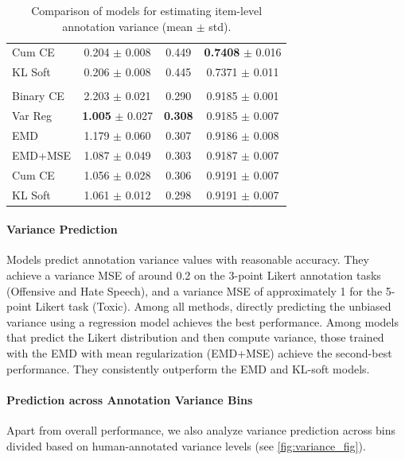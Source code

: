 \documentclass{article} %
\begin{document}
\begin{table}{}
{\begin{tabular}{l c c c}
Cum CE        &  0.204 {\scriptsize$\pm$ 0.008} & 0.449 & \textbf{0.7408} {\scriptsize$\pm$ 0.016} \\
KL Soft       &  0.206 {\scriptsize$\pm$ 0.008} & 0.445 & 0.7371 {\scriptsize$\pm$ 0.011} \\\midrule

\rowcolor{lightblue} \multicolumn{4}{l}{\textbf{Toxic}} \\ \midrule
Binary CE        &  2.203 {\scriptsize$\pm$ 0.021} & 0.290 & 0.9185 {\scriptsize$\pm$ 0.001} \\\hdashline
Var Reg       &  \textbf{1.005} {\scriptsize$\pm$ 0.027} &\textbf{ 0.308} & 0.9185 {\scriptsize$\pm$ 0.007} \\
EMD           &  1.179 {\scriptsize$\pm$ 0.060} & 0.307 & 0.9186 {\scriptsize$\pm$ 0.008} \\
EMD+MSE       &  1.087 {\scriptsize$\pm$ 0.049} & 0.303 & 0.9187 {\scriptsize$\pm$ 0.007} \\
Cum CE        &  1.056 {\scriptsize$\pm$ 0.028} & 0.306 & 0.9191 {\scriptsize$\pm$ 0.007} \\
KL Soft       &  1.061 {\scriptsize$\pm$ 0.012} & 0.298 & 0.9191 {\scriptsize$\pm$ 0.007} \\

\bottomrule
\end{tabular}
}
\caption{Comparison of models for estimating item-level annotation variance (mean $\pm$ std).}\vspace{-14.5pt}
\label{var_pred}
\end{table}


\paragraph{Variance Prediction} 
Models predict annotation variance values with reasonable accuracy. They achieve a variance MSE of around 0.2 on the 3-point Likert annotation tasks (Offensive and Hate Speech), and a variance MSE of approximately 1 for the 5-point Likert task (Toxic). 
Among all methods, directly predicting the unbiased variance using a regression model achieves the best performance. Among models that predict the Likert distribution and then compute variance, those trained with the EMD with mean regularization (EMD+MSE) achieve the second-best performance. They consistently outperform the EMD and KL-soft models. 



\paragraph{Prediction across Annotation Variance Bins\vspace{0pt}} 
Apart from overall performance, we also analyze variance prediction across
bins divided based on human-annotated variance levels (see
\cref{fig:variance_fig}). 
\end{document}
